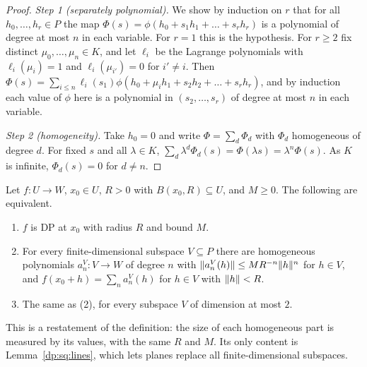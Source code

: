 \begin{proof}
\emph{Step 1 (separately polynomial).} We show by induction on $r$ that for all $h_0,\dots,h_r\in P$ the map $\Phi(s)=\phi(h_0+s_1h_1+\dots+s_rh_r)$ is a polynomial of degree at most $n$ in each variable. For $r=1$ this is the hypothesis. For $r\ge2$ fix distinct $\mu_0,\dots,\mu_n\in K$, and let $\ell_i$ be the Lagrange polynomials with $\ell_i(\mu_i)=1$ and $\ell_i(\mu_{i'})=0$ for $i'\ne i$. Then $\Phi(s)=\sum_{i\le n}\ell_i(s_1)\phi(h_0+\mu_ih_1+s_2h_2+\dots+s_rh_r)$, and by induction each value of $\phi$ here is a polynomial in $(s_2,\dots,s_r)$ of degree at most $n$ in each variable.

\emph{Step 2 (homogeneity).} Take $h_0=0$ and write $\Phi=\sum_d\Phi_d$ with $\Phi_d$ homogeneous of degree $d$. For fixed $s$ and all $\lambda\in K$, $\sum_d\lambda^d\Phi_d(s)=\Phi(\lambda s)=\lambda^n\Phi(s)$. As $K$ is infinite, $\Phi_d(s)=0$ for $d\ne n$.
\end{proof}

\begin{proposition}[slices]\label{dp:prop:slices}
Let $f\colon U\to W$, $x_0\in U$, $R>0$ with $B(x_0,R)\subseteq U$, and $M\ge0$. The following are equivalent.
\begin{enumerate}
\item $f$ is DP at $x_0$ with radius $R$ and bound $M$.
\item For every finite-dimensional subspace $V\subseteq P$ there are homogeneous polynomials $a_n^V\colon V\to W$ of degree $n$ with $\lVert a_n^V(h)\rVert\le MR^{-n}\lVert h\rVert^n$ for $h\in V$, and $f(x_0+h)=\sum_na_n^V(h)$ for $h\in V$ with $\lVert h\rVert<R$.
\item The same as \textup{(2)}, for every subspace $V$ of dimension at most $2$.
\end{enumerate}
\end{proposition}

This is a restatement of the definition: the size of each homogeneous part is measured by its values, with the same $R$ and $M$. Its only content is Lemma~\ref{dp:sq:lines}, which lets planes replace all finite-dimensional subspaces.

